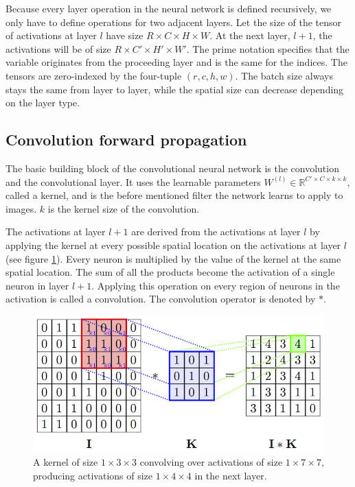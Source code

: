 \documentclass[a4paper, twoside]{article}
\begin{document}
Because every layer operation in the neural network is defined recursively, we only have to define operations for two adjacent layers. Let the size of the tensor of activations at layer $l$ have size $R \times C \times H \times W$. At the next layer, $l+1$, the activations will be of size $R \times C' \times H' \times W'$. The prime notation specifies that the variable originates from the proceeding layer and is the same for the indices. The tensors are zero-indexed by the four-tuple $(r, c, h, w)$. The batch size always stays the same from layer to layer, while the spatial size can decrease depending on the layer type. \cite{cs231n} \cite{convmath}

\subsection{Convolution forward propagation}
The basic building block of the convolutional neural network is the convolution and the convolutional layer. It uses the learnable parameters $W^{(l)} \in \mathbb{R}^{C' \times C  \times k \times k}$, called a kernel, and is the before mentioned filter the network learns to apply to images. $k$ is the kernel size of the convolution. \cite{cs231n}

The activations at layer $l+1$ are derived from the activations at layer $l$ by applying the kernel at every possible spatial location on the activations at layer $l$ (see figure \ref{figkonv}). Every neuron is multiplied by the value of the kernel at the same spatial location. The sum of all the products become the activation of a single neuron in layer $l+1$. Applying this operation on every region of neurons in the activation is called a convolution. The convolution operator is denoted by $*$. \cite{cs231n} \cite{convmath} \cite{convarithmetic}

\begin{figure}[h]
	\centering
  		\includegraphics[scale=2.1]{convolution.png}
  	\caption{A kernel of size $1 \times 3 \times 3$ convolving over activations of size $1 \times 7 \times 7$, producing activations of size $1 \times 4 \times 4$ in the next layer. \cite{figconv}} \label{figkonv}
\end{figure}
\end{document}
